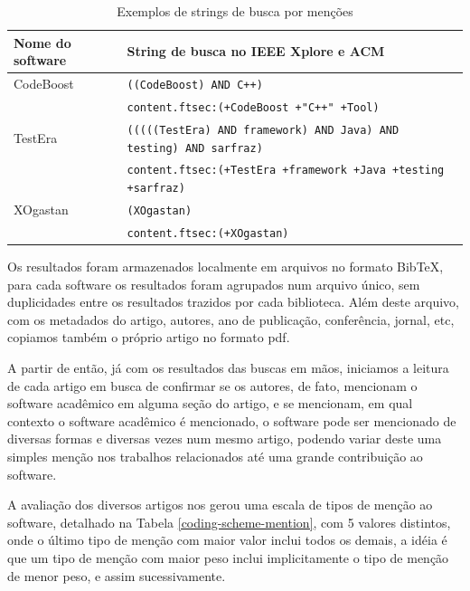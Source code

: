 \begin{table}[h]
\caption{Exemplos de strings de busca por menções}
\centering
\begin{tabular}{ l p{10cm} }
  \hline
  Nome do software   & String de busca no IEEE Xplore e ACM \\
  \hline
  CodeBoost          & {\tt ((CodeBoost) AND C++)} \\
                     & {\tt content.ftsec:(+CodeBoost +"C++" +Tool)} \\
  \hline
  TestEra            & {\tt (((((TestEra) AND framework) AND Java) AND testing) AND sarfraz)} \\
                     & {\tt content.ftsec:(+TestEra +framework +Java +testing +sarfraz)} \\
  \hline
  XOgastan           & {\tt (XOgastan)} \\
                     & {\tt content.ftsec:(+XOgastan)} \\
  \hline
\end{tabular}
\label{exemplos-strings}
\end{table}

Os resultados foram armazenados localmente em arquivos no formato BibTeX, para
cada software os resultados foram agrupados num arquivo único, sem duplicidades
entre os resultados trazidos por cada biblioteca. Além deste arquivo, com os
metadados do artigo, autores, ano de publicação, conferência, jornal, etc,
copiamos também o próprio artigo no formato pdf.

A partir de então, já com os resultados das buscas em mãos, iniciamos a leitura
de cada artigo em busca de confirmar se os autores, de fato, mencionam o
software acadêmico em alguma seção do artigo, e se mencionam, em qual contexto
o software acadêmico é mencionado, o software pode ser mencionado de diversas
formas e diversas vezes num mesmo artigo, podendo variar deste uma simples
menção nos trabalhos relacionados até uma grande contribuição ao software.

A avaliação dos diversos artigos nos gerou uma escala de tipos de menção ao
software, detalhado na Tabela \ref{coding-scheme-mention}, com 5 valores
distintos, onde o último tipo de menção com maior valor inclui todos os demais,
a idéia é que um tipo de menção com maior peso inclui implicitamente o tipo de
menção de menor peso, e assim sucessivamente.

